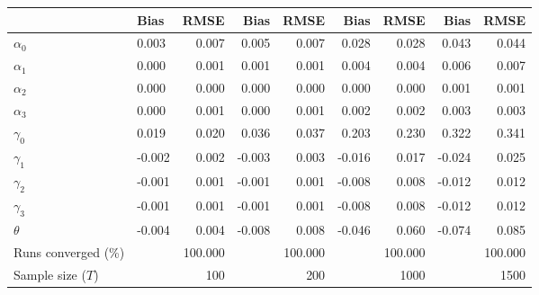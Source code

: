 
\begin{tabular}[t]{llrrrrrrr}
\toprule
  & Bias & RMSE & Bias & RMSE & Bias & RMSE & Bias & RMSE\\
\midrule
$\alpha_{0}$ & 0.003 & 0.007 & 0.005 & 0.007 & 0.028 & 0.028 & 0.043 & 0.044\\
$\alpha_{1}$ & 0.000 & 0.001 & 0.001 & 0.001 & 0.004 & 0.004 & 0.006 & 0.007\\
$\alpha_{2}$ & 0.000 & 0.000 & 0.000 & 0.000 & 0.000 & 0.000 & 0.001 & 0.001\\
$\alpha_{3}$ & 0.000 & 0.001 & 0.000 & 0.001 & 0.002 & 0.002 & 0.003 & 0.003\\
$\gamma_{0}$ & 0.019 & 0.020 & 0.036 & 0.037 & 0.203 & 0.230 & 0.322 & 0.341\\
$\gamma_{1}$ & -0.002 & 0.002 & -0.003 & 0.003 & -0.016 & 0.017 & -0.024 & 0.025\\
$\gamma_{2}$ & -0.001 & 0.001 & -0.001 & 0.001 & -0.008 & 0.008 & -0.012 & 0.012\\
$\gamma_{3}$ & -0.001 & 0.001 & -0.001 & 0.001 & -0.008 & 0.008 & -0.012 & 0.012\\
$\theta$ & -0.004 & 0.004 & -0.008 & 0.008 & -0.046 & 0.060 & -0.074 & 0.085\\
Runs converged (\%) &  & 100.000 &  & 100.000 &  & 100.000 &  & 100.000\\
Sample size ($T$) &  & 100 &  & 200 &  & 1000 &  & 1500\\
\bottomrule
\end{tabular}
